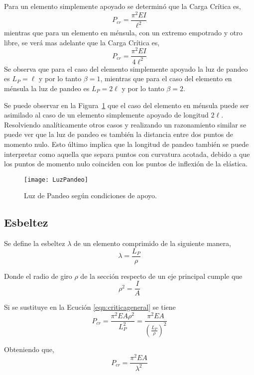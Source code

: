 Para un elemento simplemente apoyado se determinó que la Carga Crítica es,
$$P_{cr} = \frac{\pi^2 E I}{\ell^2}$$
mientras que para un elemento en ménsula, con un extremo empotrado y otro libre, se verá mas adelante que la Carga Crítica es,
$$P_{cr} = \frac{\pi^2 E I}{4\ell^2}$$
Se observa que para el caso del elemento simplemente apoyado la luz de pandeo es $L_P=\ell$ y por lo tanto $\beta=1$, mientras que para el caso del elemento en ménsula la luz de pandeo es $L_P=2\ell$ y por lo tanto $\beta=2$. 

Se puede observar en la Figura~\ref{fig:luzpandeo} que el caso del elemento en ménsula puede ser asimilado al caso de un elemento simplemente apoyado de longitud $2\ell$. Resolviendo analíticamente otros casos y realizando un razonamiento similar se puede ver que la luz de pandeo es también la distancia entre dos puntos de momento nulo. Esto último implica que la longitud de pandeo también se puede interpretar como aquella que separa puntos con curvatura acotada, debido a que los puntos de momento nulo coinciden con los puntos de inflexión de la elástica.

\begin{figure}[htb]
	\centering
	\texttt{[image: LuzPandeo]}
	\caption{Luz de Pandeo según condiciones de apoyo.}
	\label{fig:luzpandeo}
\end{figure}

\subsection{Esbeltez}

Se define la esbeltez $\lambda$ de un elemento comprimido de la siguiente manera,
\begin{equation}
\lambda = \frac{L_P}{\rho}
\end{equation}

Donde el radio de giro $\rho$ de la sección respecto de un eje principal cumple que
\begin{equation}
\rho^2 = \frac{I}{A}
\end{equation}

Si se sustituye en la Ecución \eqref{eqn:criticageneral} se tiene
$$
P_{cr} = \frac{\pi^2 E A \rho^2}{L_P^2} = \frac{\pi^2 E A}{\left(\frac{L_P}{\rho}\right)^2}
$$

Obteniendo que,
\begin{equation}
\boxed{P_{cr} = \frac{\pi^2 E A}{\lambda^2}}
\end{equation}

